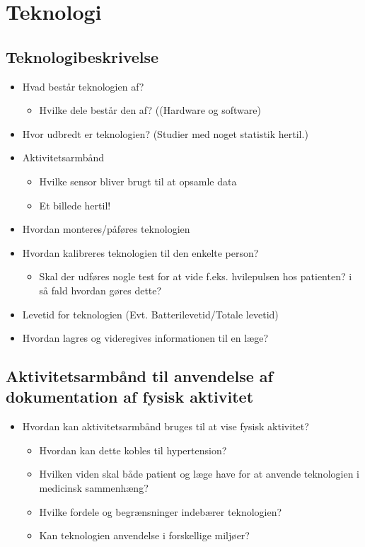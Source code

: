 
\chapter{Teknologi}


\section{Teknologibeskrivelse}
\begin{itemize}
\item Hvad består teknologien af?
\begin{itemize}
\item Hvilke dele består den af? ((Hardware og software)
\end{itemize}
\item Hvor udbredt er teknologien? (Studier med noget statistik hertil.)
\item Aktivitetsarmbånd
\begin{itemize}
\item Hvilke sensor bliver brugt til at opsamle data
\item Et billede hertil!
\end{itemize}
\item Hvordan monteres/påføres teknologien 
\item Hvordan kalibreres teknologien til den enkelte person?
\begin{itemize}
\item Skal der udføres nogle test for at vide f.eks. hvilepulsen hos patienten? i så fald hvordan gøres dette?
\end{itemize}
\item Levetid for teknologien (Evt. Batterilevetid/Totale levetid)
\item Hvordan lagres og videregives informationen til en læge?
\end{itemize}

\section{Aktivitetsarmbånd til anvendelse af dokumentation af fysisk aktivitet}
\begin{itemize}
\item Hvordan kan aktivitetsarmbånd bruges til at vise fysisk aktivitet?
\begin{itemize}
\item Hvordan kan dette kobles til hypertension?
\item Hvilken viden skal både patient og læge have for at anvende teknologien i medicinsk sammenhæng?
\item Hvilke fordele og begrænsninger indebærer teknologien?
\end{itemize}
\begin{itemize}
\item Kan teknologien anvendelse i forskellige miljøer?
\end{itemize}

\end{itemize}

